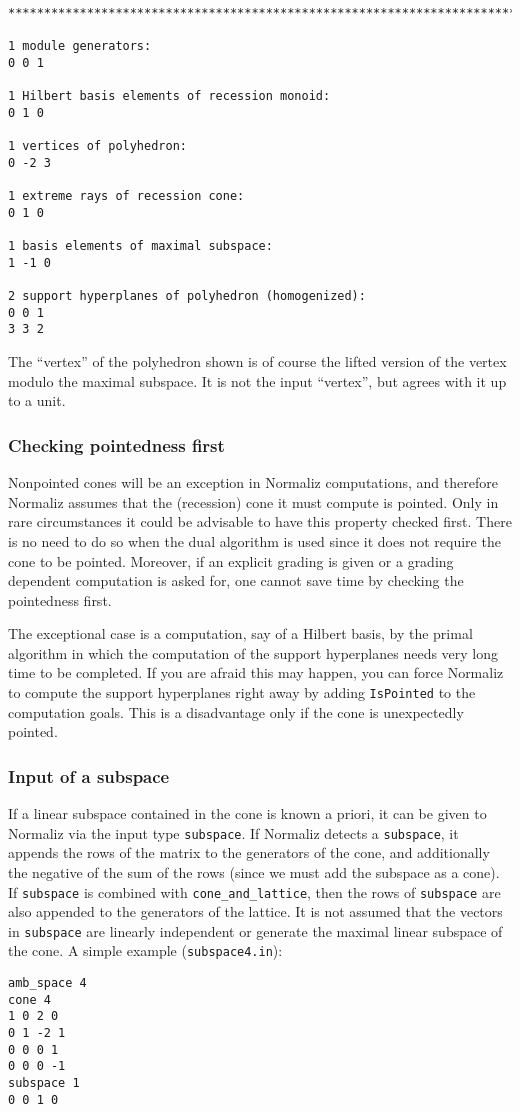 \documentclass[12pt,a4paper]{scrartcl}
\theoremstyle{definition}
\begin{document}
{\begin{Verbatim}
***********************************************************************

1 module generators:
0 0 1

1 Hilbert basis elements of recession monoid:
0 1 0

1 vertices of polyhedron:
0 -2 3

1 extreme rays of recession cone:
0 1 0

1 basis elements of maximal subspace:
1 -1 0

2 support hyperplanes of polyhedron (homogenized):
0 0 1
3 3 2
\end{Verbatim}

The ``vertex'' of the polyhedron shown is of course the lifted version of the vertex modulo the maximal subspace. It is not the input ``vertex'', but agrees with it up to a unit.

\subsubsection{Checking pointedness first}\label{IsPointed}

Nonpointed cones will be an exception in Normaliz computations, and therefore Normaliz assumes that the (recession) cone it must compute is pointed. Only in rare circumstances it could be advisable to have this property checked first. There is no need to do so when the dual algorithm is used since it does not require the cone to be pointed. Moreover, if an explicit grading is given or a grading dependent computation is asked for, one cannot save time by checking the pointedness first.

The exceptional case is a computation, say of a Hilbert basis, by the primal algorithm in which the computation of the support hyperplanes needs very long time to be completed. If you are afraid this may happen, you can force Normaliz to compute the support hyperplanes right away by adding \verb|IsPointed| to the computation goals. This is a disadvantage only if the cone is unexpectedly pointed.

\subsubsection{Input of a subspace} \label{subspace}

If a linear subspace contained in the cone is known a priori, it can be given to Normaliz via the input type \verb|subspace|. If Normaliz detects a \verb|subspace|, it appends the rows of the matrix to the generators of the cone, and additionally the negative of the sum of the rows (since we must add the subspace as a cone). If \verb|subspace| is combined with \verb|cone_and_lattice|, then the rows of \verb|subspace| are also appended to the generators of the lattice. It is not assumed that the vectors in \verb|subspace| are linearly independent or generate the maximal linear subspace of the cone. A simple example (\verb|subspace4.in|):
\begin{Verbatim}
amb_space 4
cone 4
1 0 2 0
0 1 -2 1
0 0 0 1
0 0 0 -1
subspace 1
0 0 1 0
\end{Verbatim}

}
\end{document}
